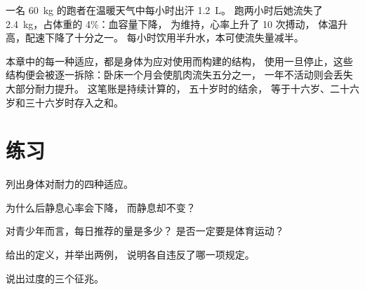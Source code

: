 \begin{example}[数字中的水合]\label{ex:g10:sport-and-health:water}
一名 \qty{60}{kg} 的跑者在温暖天气中每小时出汗 \qty{1.2}{L}。
跑两小时后她流失了 \qty{2.4}{kg}，占体重的 4\%：血容量下降，
为维持，心率上升了 10 次搏动，
体温升高，配速下降了十分之一。
每小时饮用半升水，本可使流失量减半。
\end{example}

\begin{remark}[身体记着这笔账]\label{rem:g10:sport-and-health:account}
本章中的每一种适应，都是身体为应对使用而构建的结构，
使用一旦停止，这些结构便会被逐一拆除：卧床一个月会使肌肉流失五分之一，
一年不活动则会丢失大部分耐力提升。
这笔账是持续计算的，
五十岁时的结余，
等于十六岁、二十六岁和三十六岁时存入之和。
\end{remark}

\section{练习}

\begin{exercise}[$\star$]\label{exo:g10:sport-and-health:1}
列出身体对耐力的四种适应。
\end{exercise}

\begin{exercise}[$\star$]\label{exo:g10:sport-and-health:2}
为什么后静息心率会下降，
而静息却不变？
\end{exercise}

\begin{exercise}[$\star$]\label{exo:g10:sport-and-health:3}
对青少年而言，每日推荐的量是多少？
是否一定要是体育运动？
\end{exercise}

\begin{exercise}[$\star$]\label{exo:g10:sport-and-health:4}
给出的定义，并举出两例，
说明各自违反了哪一项规定。
\end{exercise}

\begin{exercise}[$\star$]\label{exo:g10:sport-and-health:5}
说出过度的三个征兆。
\end{exercise}

